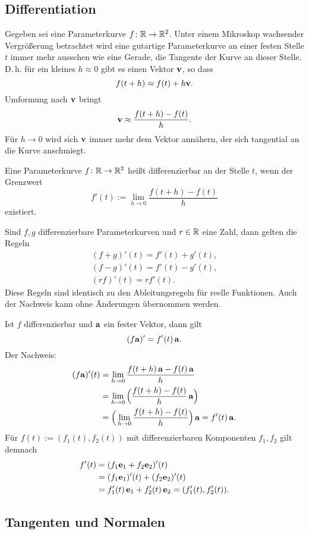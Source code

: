 \subsection{Differentiation}

Gegeben sei eine Parameterkurve $f\colon\mathbb R\to\mathbb R^2$. Unter einem
Mikroskop wachsender Vergrößerung betrachtet wird eine gutartige
Parameterkurve an einer festen Stelle $t$ immer mehr aussehen wie eine
Gerade, die Tangente der Kurve an dieser Stelle. D.\,h. für
ein kleines $h\approx 0$ gibt es einen Vektor $\mathbf{v}$, so dass%
\[f(t+h) \approx f(t)+h\mathbf{v}.\]
Umformung nach $\mathbf{v}$ bringt
\[\mathbf{v} \approx \frac{f(t+h)-f(t)}{h}.\]
Für $h\to 0$ wird sich $\mathbf{v}$ immer mehr dem Vektor annähern,
der sich tangential an die Kurve anschmiegt.

 Eine Parameterkurve $f\colon\mathbb R\to\mathbb R^2$ heißt
differenzierbar an der Stelle $t$, wenn der Grenzwert%
\[f'(t) := \lim_{h\to 0}\frac{f(t+h)-f(t)}{h}\]
existiert.

Sind $f,g$ differenzierbare Parameterkurven und $r\in\mathbb R$ eine Zahl,
dann gelten die Regeln%
\begin{gather*}
(f+g)'(t) = f'(t)+g'(t),\\
(f-g)'(t) = f'(t)-g'(t),\\
(rf)'(t) = rf'(t).
\end{gather*}
Diese Regeln sind identisch zu den Ableitungsregeln für reelle
Funktionen. Auch der Nachweis kann ohne Änderungen übernommen
werden.

Ist $f$ differenzierbar und $\mathbf{a}$ ein fester Vektor, dann gilt%
\[(f\mathbf{a})' = f'(t)\,\mathbf{a}.\]
Der Nachweis:
\begin{align*}
(f\mathbf{a})'(t) &= \lim_{h\to 0}\frac{f(t+h)\,\mathbf{a}-f(t)\,\mathbf{a}}{h}\\
&= \lim_{h\to 0}\Big(\frac{f(t+h)-f(t)}{h}\,\mathbf{a}\Big)\\
&= \Big(\lim_{h\to 0}\frac{f(t+h)-f(t)}{h}\Big)\,\mathbf{a}
= f'(t)\,\mathbf{a}.
\end{align*}
Für $f(t):=(f_1(t),f_2(t))$ mit differenzierbaren Komponenten
$f_1,f_2$ gilt demnach
\begin{align*}
f'(t) &= (f_1\mathbf{e}_1+f_2\mathbf{e}_2)'(t)\\
&= (f_1\mathbf{e}_1)'(t)+(f_2\mathbf{e}_2)'(t)\\
&= f_1'(t)\,\mathbf{e}_1+f_2'(t)\,\mathbf{e}_2 = (f_1'(t),f_2'(t)).
\end{align*}

\subsection{Tangenten und Normalen}

